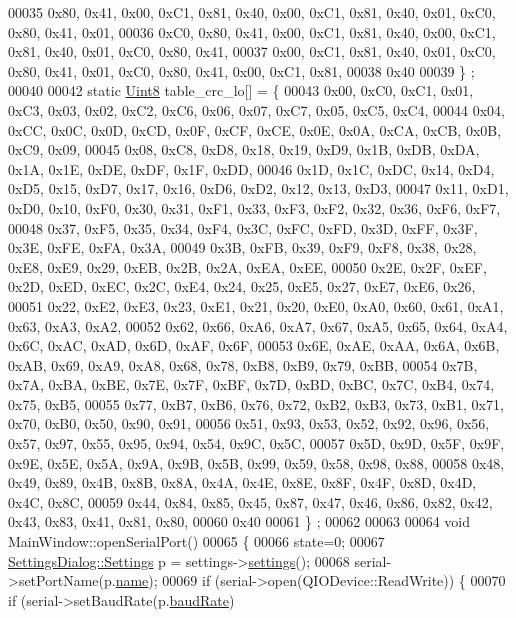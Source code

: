 \begin{DoxyCode}
00035 0x80, 0x41, 0x00, 0xC1, 0x81, 0x40, 0x00, 0xC1, 0x81, 0x40, 0x01, 0xC0, 0x80, 0x41, 0x01,
00036 0xC0, 0x80, 0x41, 0x00, 0xC1, 0x81, 0x40, 0x00, 0xC1, 0x81, 0x40, 0x01, 0xC0, 0x80, 0x41,
00037 0x00, 0xC1, 0x81, 0x40, 0x01, 0xC0, 0x80, 0x41, 0x01, 0xC0, 0x80, 0x41, 0x00, 0xC1, 0x81,
00038 0x40
00039 \} ;
00040 
00042 \textcolor{keyword}{static} \hyperlink{a00004_a979e3e23b9a449e69ab6a8a83b6042f8}{Uint8} table\_crc\_lo[] = \{
00043 0x00, 0xC0, 0xC1, 0x01, 0xC3, 0x03, 0x02, 0xC2, 0xC6, 0x06, 0x07, 0xC7, 0x05, 0xC5, 0xC4,
00044 0x04, 0xCC, 0x0C, 0x0D, 0xCD, 0x0F, 0xCF, 0xCE, 0x0E, 0x0A, 0xCA, 0xCB, 0x0B, 0xC9, 0x09,
00045 0x08, 0xC8, 0xD8, 0x18, 0x19, 0xD9, 0x1B, 0xDB, 0xDA, 0x1A, 0x1E, 0xDE, 0xDF, 0x1F, 0xDD,
00046 0x1D, 0x1C, 0xDC, 0x14, 0xD4, 0xD5, 0x15, 0xD7, 0x17, 0x16, 0xD6, 0xD2, 0x12, 0x13, 0xD3,
00047 0x11, 0xD1, 0xD0, 0x10, 0xF0, 0x30, 0x31, 0xF1, 0x33, 0xF3, 0xF2, 0x32, 0x36, 0xF6, 0xF7,
00048 0x37, 0xF5, 0x35, 0x34, 0xF4, 0x3C, 0xFC, 0xFD, 0x3D, 0xFF, 0x3F, 0x3E, 0xFE, 0xFA, 0x3A,
00049 0x3B, 0xFB, 0x39, 0xF9, 0xF8, 0x38, 0x28, 0xE8, 0xE9, 0x29, 0xEB, 0x2B, 0x2A, 0xEA, 0xEE,
00050 0x2E, 0x2F, 0xEF, 0x2D, 0xED, 0xEC, 0x2C, 0xE4, 0x24, 0x25, 0xE5, 0x27, 0xE7, 0xE6, 0x26,
00051 0x22, 0xE2, 0xE3, 0x23, 0xE1, 0x21, 0x20, 0xE0, 0xA0, 0x60, 0x61, 0xA1, 0x63, 0xA3, 0xA2,
00052 0x62, 0x66, 0xA6, 0xA7, 0x67, 0xA5, 0x65, 0x64, 0xA4, 0x6C, 0xAC, 0xAD, 0x6D, 0xAF, 0x6F,
00053 0x6E, 0xAE, 0xAA, 0x6A, 0x6B, 0xAB, 0x69, 0xA9, 0xA8, 0x68, 0x78, 0xB8, 0xB9, 0x79, 0xBB,
00054 0x7B, 0x7A, 0xBA, 0xBE, 0x7E, 0x7F, 0xBF, 0x7D, 0xBD, 0xBC, 0x7C, 0xB4, 0x74, 0x75, 0xB5,
00055 0x77, 0xB7, 0xB6, 0x76, 0x72, 0xB2, 0xB3, 0x73, 0xB1, 0x71, 0x70, 0xB0, 0x50, 0x90, 0x91,
00056 0x51, 0x93, 0x53, 0x52, 0x92, 0x96, 0x56, 0x57, 0x97, 0x55, 0x95, 0x94, 0x54, 0x9C, 0x5C,
00057 0x5D, 0x9D, 0x5F, 0x9F, 0x9E, 0x5E, 0x5A, 0x9A, 0x9B, 0x5B, 0x99, 0x59, 0x58, 0x98, 0x88,
00058 0x48, 0x49, 0x89, 0x4B, 0x8B, 0x8A, 0x4A, 0x4E, 0x8E, 0x8F, 0x4F, 0x8D, 0x4D, 0x4C, 0x8C,
00059 0x44, 0x84, 0x85, 0x45, 0x87, 0x47, 0x46, 0x86, 0x82, 0x42, 0x43, 0x83, 0x41, 0x81, 0x80,
00060 0x40
00061 \} ;
00062 
00063 
00064 \textcolor{keywordtype}{void} MainWindow::openSerialPort()
00065 \{
00066     state=0;
00067     \hyperlink{a00075_dc/d9a/a00218}{SettingsDialog::Settings} p = settings->\hyperlink{a00075_afeb533d711d0392b9856c63b40b65ad7}{settings}();
00068     serial->setPortName(p.\hyperlink{a00075_a973c8cfb942a512f34fc4227c0caa6dd}{name});
00069     \textcolor{keywordflow}{if} (serial->open(QIODevice::ReadWrite)) \{
00070         \textcolor{keywordflow}{if} (serial->setBaudRate(p.\hyperlink{a00075_ac19cc9431552857a75c657a464ba0700}{baudRate})

\end{DoxyCode}
